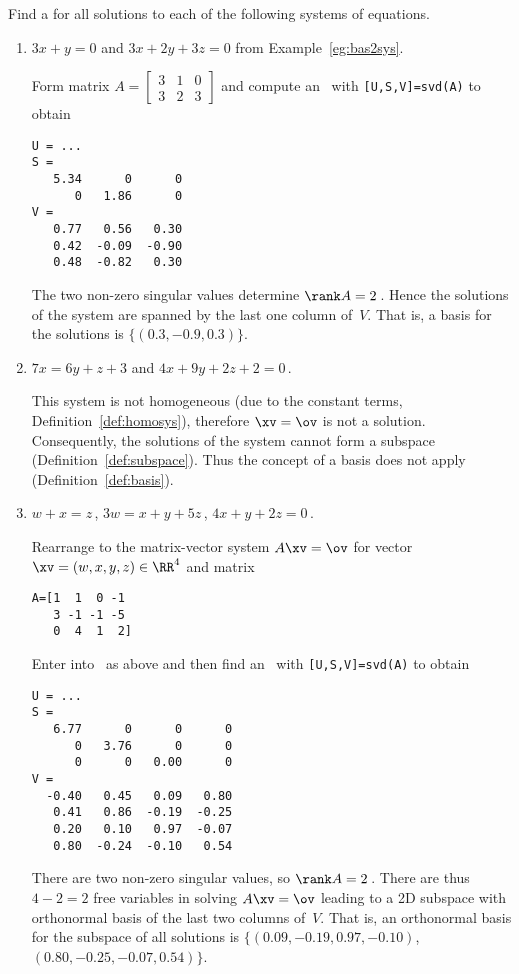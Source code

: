 \begin{example} \label{eg:}
Find a  for all solutions to each of the following systems of equations.
\begin{enumerate}
\item \(3x+y=0\) and \(3x+2y+3z=0\) from Example~\ref{eg:bas2sys}.
\begin{solution} 
Form matrix \(A=\begin{bmatrix} 3&1&0\\3&2&3 \end{bmatrix}\) and compute an \svd\ with \verb|[U,S,V]=svd(A)| to obtain \twodp
\begin{verbatim}
U = ...
S =
   5.34      0      0
      0   1.86      0
V =
   0.77   0.56   0.30
   0.42  -0.09  -0.90
   0.48  -0.82   0.30
\end{verbatim}
The two non-zero singular values determine \(\rank A=2\)\,.
Hence the solutions of the system are spanned by the last one column of~\(V\).  
That is, a basis for the solutions is \(\{(0.3,-0.9,0.3)\}\).
\end{solution}

\item \(7x=6y+z+3\) and \(4x+9y+2z+2=0\)\,.
\begin{solution} 
This system is not homogeneous (due to the constant terms, Definition~\ref{def:homosys}), therefore \(\xv=\ov\) is not a solution. Consequently, the solutions of the system cannot form a subspace (Definition~\ref{def:subspace}). 
Thus the concept of a basis does not apply (Definition~\ref{def:basis}). 
\end{solution}


\item \(w+x=z\)\,,
\(3w=x+y+5z\)\,,
\(4x+y+2z=0\)\,.
\begin{solution} 
Rearrange to the matrix-vector system \(A\xv=\ov\) for vector \(\xv=(w,x,y,z)\in\RR^4\) and matrix
\begin{verbatim}
A=[1  1  0 -1
   3 -1 -1 -5
   0  4  1  2]
\end{verbatim}
\setbox\ajrqrbox\hbox{}%
\marginpar{\usebox{\ajrqrbox}}%
Enter into \script\ as above and then find an \svd\ with \verb|[U,S,V]=svd(A)| to obtain \twodp
\begin{verbatim}
U = ...
S =
   6.77      0      0      0
      0   3.76      0      0
      0      0   0.00      0
V =
  -0.40   0.45   0.09   0.80
   0.41   0.86  -0.19  -0.25
   0.20   0.10   0.97  -0.07
   0.80  -0.24  -0.10   0.54
\end{verbatim}
There are two non-zero singular values, so \(\rank A=2\)\,.
There are thus \(4-2=2\) free variables in solving \(A\xv=\ov\) leading to a 2D subspace with orthonormal basis of the last two columns of~\(V\).
That is, an orthonormal basis for the subspace of all solutions is \(\{(0.09,-0.19,0.97,-0.10)\), \((0.80,-0.25,-0.07,0.54)\}\). 
\end{solution}

\end{enumerate}
\end{example}
